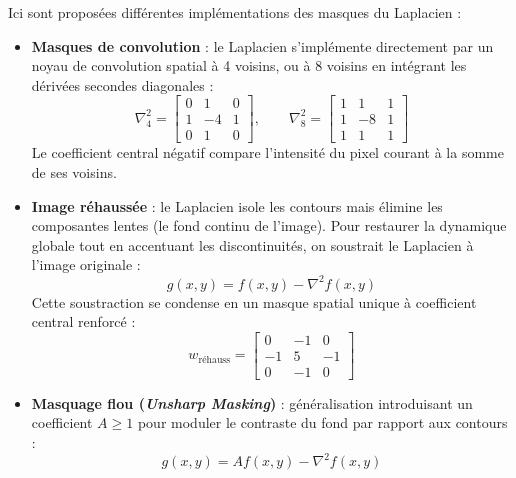 \begin{proposition}
    Ici sont proposées différentes implémentations des masques du Laplacien : 
    \begin{itemize}
        \item \textbf{Masques de convolution} : le Laplacien s'implémente directement par un noyau de convolution spatial à 4 voisins, ou à 8 voisins en intégrant les dérivées secondes diagonales :
            \begin{equation}
                \nabla^2_{4} = \begin{bmatrix} 0 & 1 & 0 \\ 1 & -4 & 1 \\ 0 & 1 & 0 \end{bmatrix}, \qquad 
                \nabla^2_{8} = \begin{bmatrix} 1 & 1 & 1 \\ 1 & -8 & 1 \\ 1 & 1 & 1 \end{bmatrix}
            \end{equation}
            Le coefficient central négatif compare l'intensité du pixel courant à la somme de ses voisins.
        \item \textbf{Image réhaussée} : le Laplacien isole les contours mais élimine les composantes lentes (le fond continu de l'image). Pour restaurer la dynamique globale tout en accentuant les discontinuités, on soustrait le Laplacien à l'image originale :
            \begin{equation}
                g(x,y) = f(x,y) - \nabla^2 f(x,y)
            \end{equation}
            Cette soustraction se condense en un masque spatial unique à coefficient central renforcé :
            \begin{equation}
                w_{\text{réhauss}} = \begin{bmatrix} 0 & -1 & 0 \\ -1 & 5 & -1 \\ 0 & -1 & 0 \end{bmatrix}
            \end{equation}
        \item \textbf{Masquage flou (\emph{Unsharp Masking})} : généralisation introduisant un coefficient $A \geqslant 1$ pour moduler le contraste du fond par rapport aux contours :
            \begin{equation}
                g(x,y) = A f(x,y) - \nabla^2 f(x,y)
            \end{equation}
    \end{itemize}
\end{proposition}

